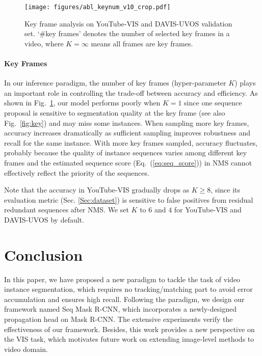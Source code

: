 \documentclass[10pt,twocolumn,letterpaper]{article}
\begin{document}
	
	\begin{figure}[t]
		\begin{center}
			\texttt{[image: figures/abl\_keynum\_v10\_crop.pdf]}
		\end{center}
		\vspace{-0.15in}
		\caption{Key frame analysis on YouTube-VIS and DAVIS-UVOS validation set. `\#key frames' denotes the number of selected key frames in a video, where $K=\infty$ means all frames are key frames. }
		\label{fig:abl_keynum}
		\vspace{-0.15in}
	\end{figure}
	
	\vspace{-0.2in}
	\paragraph{Key Frames} \label{sec:abl_keyframe}
	In our inference paradigm, the number of key frames (hyper-parameter $K$) plays an important role in controlling the trade-off between accuracy and efficiency. 
	As shown in Fig.~\ref{fig:abl_keynum}, our model performs poorly when $K=1$ since one sequence proposal is sensitive to segmentation quality at the key frame (see also Fig.~\ref{fig:key}) and may miss some instances.
	When sampling more key frames, accuracy increases dramatically as sufficient sampling improves robustness and recall for the same instance. 
	With more key frames sampled, accuracy fluctuates, probably because the quality of instance sequences varies among different key frames and the estimated sequence score (Eq.~(\ref{eq:seq_score})) in NMS cannot effectively reflect the priority of the sequences.
	
	Note that the accuracy in YouTube-VIS gradually drops as $K \ge 8$, since its evaluation metric (Sec. \ref{Sec:dataset}) is sensitive to false positives from residual redundant sequences after NMS.
	We set $K$ to $6$ and $4$ for YouTube-VIS and DAVIS-UVOS by default.
	
\section{Conclusion}
	In this paper, we have proposed a new paradigm to tackle the task of video instance segmentation, which requires no tracking/matching part to avoid error accumulation and ensures high recall.
	Following the paradigm, we design our framework named Seq Mask R-CNN, which incorporates a newly-designed propagation head on Mask R-CNN.
	The extensive experiments verify the effectiveness of our framework.
	Besides, this work provides a new perspective on the VIS task, which motivates future work on extending image-level methods to video domain.
	
\end{document}
